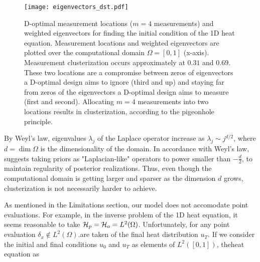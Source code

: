 \begin{figure}\label{fig:eigenvectors}
    \centering
    \texttt{[image: eigenvectors\_dst.pdf]}
    \caption{D-optimal measurement locations ($m=4$ measurements) and
      weighted eigenvectors for finding the initial condition of
      the 1D heat equation. Measurement locations and weighted
      eigenvectors are plotted over the computational domain $\Omega =
      [0, 1]$ (x-axis). Measurement clusterization occurs
      approximately at $0.31$ and $0.69$. These two locations are a
      compromise between zeros of eigenvectors a D-optimal design aims
      to ignore (third and up) and staying far from zeros of the
      eigenvectors a D-optimal design aims to measure (first and
      second). Allocating $m=4$ measurements into two locations
      results in clusterization, according to the pigeonhole
      principle.}
  \label{fig:why}
\end{figure}



By Weyl's law, eigenvalues $\lambda_j$ of the Laplace operator
increase as $\lambda_j \sim j^{d/2}$, where $d = \dim \Omega$ is the
dimensionality of the domain. In accordance with Weyl's law,
\cite[Theorem 3.1]{Stuart10} suggests taking priors as
"Laplacian-like" operators to power smaller than $-\frac{d}{2}$, to
maintain regularity of posterior realizations. Thus, even though the
computational domain is getting larger and sparser as the dimension
$d$ grows, clusterization is not necessarily harder to achieve.



As mentioned in the Limitations section, our model does not accomodate
point evaluations. For example, in the inverse problem of the 1D heat
equation, it seems reasonable to take $\mathcal{H}_p = \mathcal{H}_o =
L^2(\Omega)$. Unfortunately, for any point evaluation $\delta_x \not
\in L^2(\Omega)$.are taken of the final heat distribution $u_T$. If we
consider the initial and final conditions $u_0$ and $u_T$ as elements
of $L^2([0,1])$, theheat equation as
